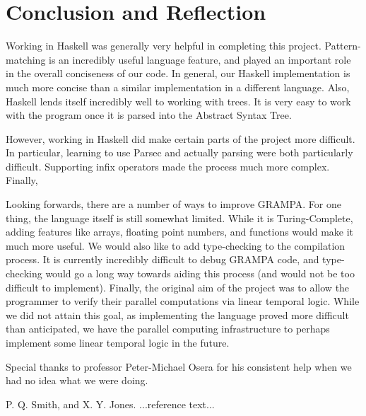 \documentclass[numbers]{sigplanconf}
\begin{document}
\section{Conclusion and Reflection}

Working in Haskell was generally very helpful in completing this project. Pattern-matching is an incredibly useful language feature, and played an important role in the overall conciseness of our code. In general, our Haskell implementation is much more concise than a similar implementation in a different language. Also, Haskell lends itself incredibly well to working with trees. It is very easy to work with the program once it is parsed into the Abstract Syntax Tree. 

However, working in Haskell did make certain parts of the project more difficult. In particular, learning to use Parsec and actually parsing were both particularly difficult. Supporting infix operators made the process much more complex. Finally, 

Looking forwards, there are a number of ways to improve GRAMPA. For one thing, the language itself is still somewhat limited. While it is Turing-Complete, adding features like arrays, floating point numbers, and functions would make it much more useful. We would also like to add type-checking to the compilation process. It is currently incredibly difficult to debug GRAMPA code, and type-checking would go a long way towards aiding this process (and would not be too difficult to implement). Finally, the original aim of the project was to allow the programmer to verify their parallel computations via linear temporal logic. While we did not attain this goal, as implementing the language proved more difficult than anticipated, we have the parallel computing infrastructure to perhaps implement some linear temporal logic in the future. 

\acks

Special thanks to professor Peter-Michael Osera for his consistent help when we had no idea what we were doing.





\begin{thebibliography}{}
\softraggedright

P. Q. Smith, and X. Y. Jones. ...reference text...

\end{thebibliography}
\end{document}
